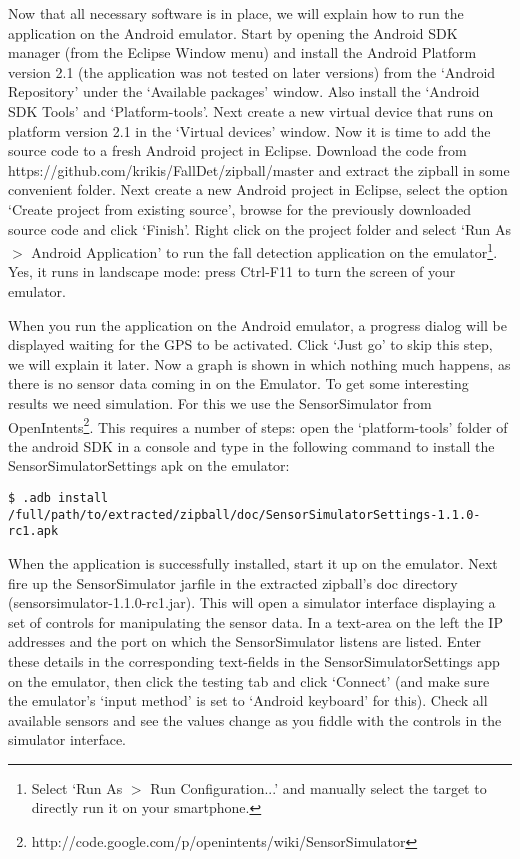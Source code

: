\documentclass[a4paper, 10pt]{article}
\begin{document}
Now that all necessary software is in place, we will explain how to run the application on the Android emulator. Start by opening the Android SDK manager (from the Eclipse Window menu) and install the Android Platform version 2.1 (the application was not tested on later versions) from the `Android Repository' under the `Available packages' window. Also install the `Android SDK Tools' and `Platform-tools'. Next create a new virtual device that runs on platform version 2.1 in the `Virtual devices' window. Now it is time to add the source code to a fresh Android project in Eclipse. Download the code from https://github.com/krikis/FallDet/zipball/master and extract the zipball in some convenient folder. Next create a new Android project in Eclipse, select the option `Create project from existing source', browse for the previously downloaded source code and click `Finish'. Right click on the project folder and select `Run As $>$ Android Application' to run the fall detection application on the emulator\footnote{Select `Run As $>$ Run Configuration...' and manually select the target to directly run it on your smartphone.}. Yes, it runs in landscape mode: press Ctrl-F11 to turn the screen of your emulator.

When you run the application on the Android emulator, a progress dialog will be displayed waiting for the GPS to be activated. Click `Just go' to skip this step, we will explain it later. Now a graph is shown in which nothing much happens, as there is no sensor data coming in on the Emulator. To get some interesting results we need simulation. For this we use the SensorSimulator from OpenIntents\footnote{http://code.google.com/p/openintents/wiki/SensorSimulator}. This requires a number of steps: open the `platform-tools' folder of the android SDK in a console and type in the following command to install the SensorSimulatorSettings apk on the emulator:
\begin{lstlisting}
$ .adb install /full/path/to/extracted/zipball/doc/SensorSimulatorSettings-1.1.0-rc1.apk
\end{lstlisting}
When the application is successfully installed, start it up on the emulator. Next fire up the SensorSimulator jarfile in the extracted zipball's doc directory (sensorsimulator-1.1.0-rc1.jar). This will open a simulator interface displaying a set of controls for manipulating the sensor data. In a text-area on the left the IP addresses and the port on which the SensorSimulator listens are listed. Enter these details in the corresponding text-fields in the SensorSimulatorSettings app on the emulator, then click the testing tab and click `Connect' (and make sure the emulator's `input method' is set to `Android keyboard' for this). Check all available sensors and see the values change as you fiddle with the controls in the simulator interface.
\end{document}
